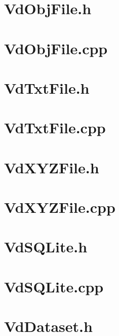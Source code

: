 \documentclass[a4paper,12pt,bibliography=totoc, listof=totoc,titlepage,pointlessnumbers]{scrreprt}
\begin{document}
\begin{appendices}
\section{VdObjFile.h}
\label{a:VdObjFile.h}


\section{VdObjFile.cpp}
\label{a:VdObjFile.cpp}


\section{VdTxtFile.h}
\label{a:VdTxtFile.h}


\section{VdTxtFile.cpp}
\label{a:VdTxtFile.cpp}


\section{VdXYZFile.h}
\label{a:VdXYZFile.h}


\section{VdXYZFile.cpp}
\label{a:VdXYZFile.cpp}


\section{VdSQLite.h}
\label{a:VdSQLite.h}


\section{VdSQLite.cpp}
\label{a:VdSQLite.cpp}


\section{VdDataset.h}
\label{a:VdDataset.h}



\end{appendices}
\end{document}

